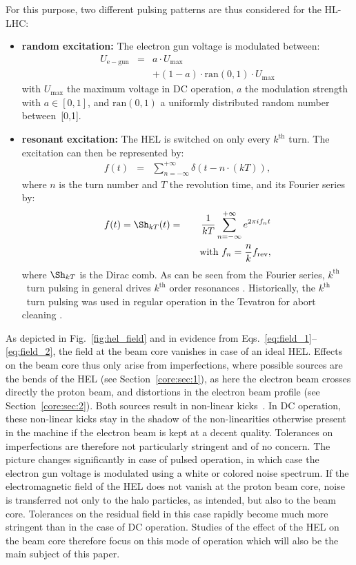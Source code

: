\documentclass[%
 reprint,
 amsmath,amssymb,
 aps,
prstab,
]{revtex4-1}
\begin{document}
For this purpose, two different pulsing patterns are thus considered
for the HL-LHC:

\begin{itemize}
	\item \textbf{random excitation:} The electron gun voltage is modulated between:
	\begin{eqnarray}
	U_{\mathrm{e-gun}}&=&a\cdot U_{\mathrm{max}}\\
	& &+(1-a)\cdot \mathrm{ran}(0,1)\cdot U_{\mathrm{max}}
	\end{eqnarray}
	with $U_{\mathrm{max}}$ the maximum voltage in DC operation, $a$ the modulation strength with $a\in[0,1]$, and $\mathrm{ran}(0,1)$ a uniformly distributed random number between~[0,1].
	\item \textbf{resonant excitation:} The HEL is switched on only every $k^{\mathrm{th}}$ turn. The excitation can then be represented by:
	\begin{eqnarray}\label{intro:eqn:1}
	f(t)&=&\sum_{n=-\infty}^{+\infty}\delta(t-n\cdot(kT)),
	\end{eqnarray}
	where $n$ is the turn number and $T$ the revolution time, and its Fourier series by:
	\begin{eqnarray}\label{intro:eqn:2}
	f(t)=\Sh_{kT}(t)
	&=&\frac{1}{kT}\sum_{n=-\infty}^{+\infty}e^{2\pi i f_nt} \\
	& & \quad \text{with} \ f_n=\frac{n}{k}f_{\rm rev},
	\end{eqnarray}
	where $\Sh_{kT}$ is the Dirac comb. As can be seen from the Fourier series, $k^{\mathrm{th}}$~turn pulsing in general drives $k^{\mathrm{th}}$ order resonances \cite{md_sim_hel_res_ex_fitterer}. Historically, the $k^{\mathrm{th}}$~turn pulsing was used in regular operation in the Tevatron for abort cleaning \cite{hel_tevatron_abortgap_zhang}.
\end{itemize}

As depicted in Fig.~\ref{fig:hel_field} and in evidence from Eqs.~\ref{eq:field_1}--\ref{eq:field_2}, the field at the beam core vanishes in case of an ideal HEL. Effects on the beam core thus only arise from imperfections, where possible sources are the bends of the HEL (see Section~\ref{core:sec:1}), as here the electron beam crosses directly the proton beam, and distortions in the electron beam profile (see Section~\ref{core:sec:2}). Both sources result in non-linear kicks~\cite{hel_bends_stancari,hel_model_polynomial_morozov}. In DC operation, these non-linear kicks stay in the shadow of the non-linearities otherwise present in the machine if the electron beam is kept at a decent quality. Tolerances on imperfections are therefore not particularly stringent and of no concern. The picture changes significantly in case of pulsed operation, in which case the electron gun voltage is modulated using a white or colored noise spectrum. If the electromagnetic field of the HEL does not vanish at the proton beam core, noise is transferred not only to the halo particles, as intended, but also to the beam core. Tolerances on the residual field in this case rapidly become much more stringent than in the case of DC operation. Studies of the effect of the HEL on the beam core therefore focus on this mode of operation which will also be the main subject of this paper.
\end{document}
